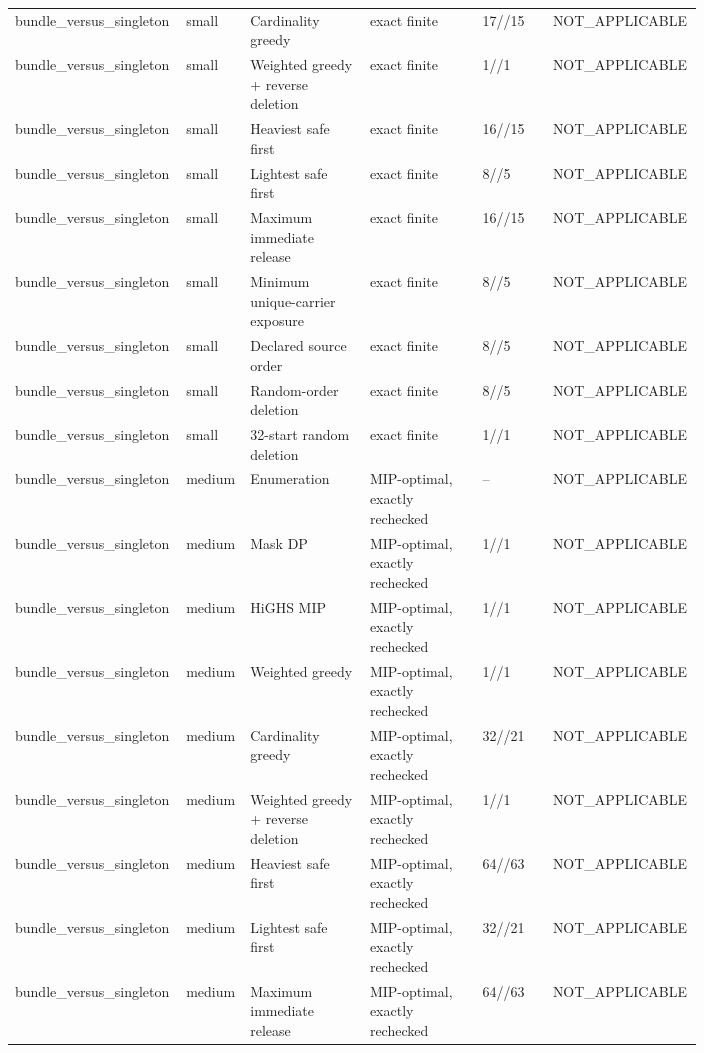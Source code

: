 {\begin{longtable}{p{0.18\linewidth}p{0.07\linewidth}p{0.17\linewidth}p{0.16\linewidth}p{0.10\linewidth}p{0.12\linewidth}}
bundle\_versus\_singleton & small & Cardinality greedy & exact finite & 17//15 & NOT\_APPLICABLE \\
bundle\_versus\_singleton & small & Weighted greedy + reverse deletion & exact finite & 1//1 & NOT\_APPLICABLE \\
bundle\_versus\_singleton & small & Heaviest safe first & exact finite & 16//15 & NOT\_APPLICABLE \\
bundle\_versus\_singleton & small & Lightest safe first & exact finite & 8//5 & NOT\_APPLICABLE \\
bundle\_versus\_singleton & small & Maximum immediate release & exact finite & 16//15 & NOT\_APPLICABLE \\
bundle\_versus\_singleton & small & Minimum unique-carrier exposure & exact finite & 8//5 & NOT\_APPLICABLE \\
bundle\_versus\_singleton & small & Declared source order & exact finite & 8//5 & NOT\_APPLICABLE \\
bundle\_versus\_singleton & small & Random-order deletion & exact finite & 8//5 & NOT\_APPLICABLE \\
bundle\_versus\_singleton & small & 32-start random deletion & exact finite & 1//1 & NOT\_APPLICABLE \\
bundle\_versus\_singleton & medium & Enumeration & MIP-optimal, exactly rechecked & -- & NOT\_APPLICABLE \\
bundle\_versus\_singleton & medium & Mask DP & MIP-optimal, exactly rechecked & 1//1 & NOT\_APPLICABLE \\
bundle\_versus\_singleton & medium & HiGHS MIP & MIP-optimal, exactly rechecked & 1//1 & NOT\_APPLICABLE \\
bundle\_versus\_singleton & medium & Weighted greedy & MIP-optimal, exactly rechecked & 1//1 & NOT\_APPLICABLE \\
bundle\_versus\_singleton & medium & Cardinality greedy & MIP-optimal, exactly rechecked & 32//21 & NOT\_APPLICABLE \\
bundle\_versus\_singleton & medium & Weighted greedy + reverse deletion & MIP-optimal, exactly rechecked & 1//1 & NOT\_APPLICABLE \\
bundle\_versus\_singleton & medium & Heaviest safe first & MIP-optimal, exactly rechecked & 64//63 & NOT\_APPLICABLE \\
bundle\_versus\_singleton & medium & Lightest safe first & MIP-optimal, exactly rechecked & 32//21 & NOT\_APPLICABLE \\
bundle\_versus\_singleton & medium & Maximum immediate release & MIP-optimal, exactly rechecked & 64//63 & NOT\_APPLICABLE \\

\end{longtable}}
